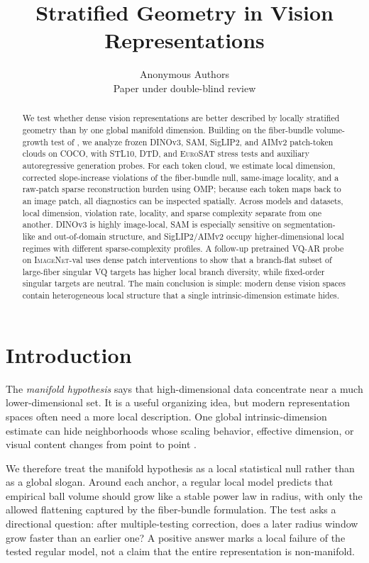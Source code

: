 \documentclass{article}
\title{Stratified Geometry in Vision Representations}
\author{
  Anonymous Authors \\
  Paper under double-blind review
}
\newcommand{\dataset}[1]{\textsc{#1}}
\begin{document}
\maketitle

\begin{abstract}
We test whether dense vision representations are better described by locally stratified geometry than by one global manifold dimension. Building on the fiber-bundle volume-growth test of \citet{robinson2025token}, we analyze frozen DINOv3, SAM, SigLIP2, and AIMv2 patch-token clouds on \dataset{COCO}, with \dataset{STL10}, \dataset{DTD}, and \dataset{EuroSAT} stress tests and auxiliary autoregressive generation probes. For each token cloud, we estimate local dimension, corrected slope-increase violations of the fiber-bundle null, same-image locality, and a raw-patch sparse reconstruction burden using OMP; because each token maps back to an image patch, all diagnostics can be inspected spatially. Across models and datasets, local dimension, violation rate, locality, and sparse complexity separate from one another. DINOv3 is highly image-local, SAM is especially sensitive on segmentation-like and out-of-domain structure, and SigLIP2/AIMv2 occupy higher-dimensional local regimes with different sparse-complexity profiles. A follow-up pretrained VQ-AR probe on \dataset{ImageNet}-val uses dense patch interventions to show that a branch-flat subset of large-fiber singular VQ targets has higher local branch diversity, while fixed-order singular targets are neutral. The main conclusion is simple: modern dense vision spaces contain heterogeneous local structure that a single intrinsic-dimension estimate hides.
\end{abstract}

\section{Introduction}
The \emph{manifold hypothesis} says that high-dimensional data concentrate near a much lower-dimensional set. It is a useful organizing idea, but modern representation spaces often need a more local description. One global intrinsic-dimension estimate can hide neighborhoods whose scaling behavior, effective dimension, or visual content changes from point to point \citep{loaiza-ganem2024deep,levina2005maximum,facco2017estimating,pope2021intrinsic,tempczyk2022lidl,tempczyk2026benchmarks}.

We therefore treat the manifold hypothesis as a local statistical null rather than as a global slogan. Around each anchor, a regular local model predicts that empirical ball volume should grow like a stable power law in radius, with only the allowed flattening captured by the fiber-bundle formulation. The test asks a directional question: after multiple-testing correction, does a later radius window grow faster than an earlier one? A positive answer marks a local failure of the tested regular model, not a claim that the entire representation is non-manifold.
\end{document}
